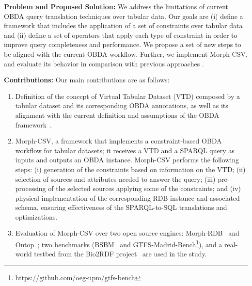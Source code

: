 \noindent\textbf{Problem and Proposed Solution:} 
We address the limitations of current OBDA query translation techniques over tabular data. Our goals are (i) define a framework that includes the application of a set of constraints over tabular data and (ii) define a set of operators that apply each type of constraint in order to improve query completeness and performance. We propose a set of new steps to be aligned with the current OBDA workflow. Further, we implement Morph-CSV, and evaluate its behavior in comparison with previous approaches .


\noindent\textbf{Contributions:} Our main contributions are as follows:
\begin{enumerate}
\item Definition of the concept of Virtual Tabular Dataset (VTD) composed by a tabular dataset and its corresponding OBDA annotations, as well as its alignment with the current definition and assumptions of the OBDA framework~\citep{xiao2018obdasurvey}.
\item Morph-CSV, a framework that implements a constraint-based OBDA workflow for tabular datasets; it receives a VTD and a SPARQL query as inputs and outputs an OBDA instance. Morph-CSV performs the following steps: (i) generation of the constraints based on information on the VTD; (ii) selection of sources and attributes needed to answer the query; (iii) pre-processing of the selected sources applying some of the constraints; and (iv) physical implementation of the corresponding RDB instance and associated schema, ensuring effectiveness of the SPARQL-to-SQL translations and optimizations.
\item Evaluation of Morph-CSV over two open source engines: Morph-RDB~\citep{priyatna2014formalisation} and Ontop~\citep{calvanese2017ontop}; two benchmarks (BSBM~\citep{bizer2009berlin} and GTFS-Madrid-Bench\footnote{https://github.com/oeg-upm/gtfs-bench}), and a real-world testbed from the Bio2RDF project~\citep{belleau2008bio2rdf} are used in the study.
\end{enumerate}




